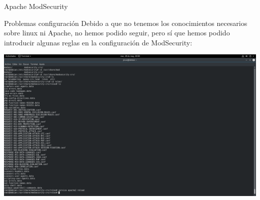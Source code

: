 \documentclass{beamer}
\begin{document}
\begin{frame}{Apache ModSecurity}
\begin{block}{Problemas configuración}
	Debido a que no tenemos los conocimientos necesarios sobre linux ni Apache, no hemos podido seguir, pero sí que hemos podido introducir algunas reglas en la configuración de ModSecurity:
	\begin{center}
		\includegraphics[scale=0.14]{reglas.png}
	\end{center}
\end{block}
\end{frame}
\end{document}
